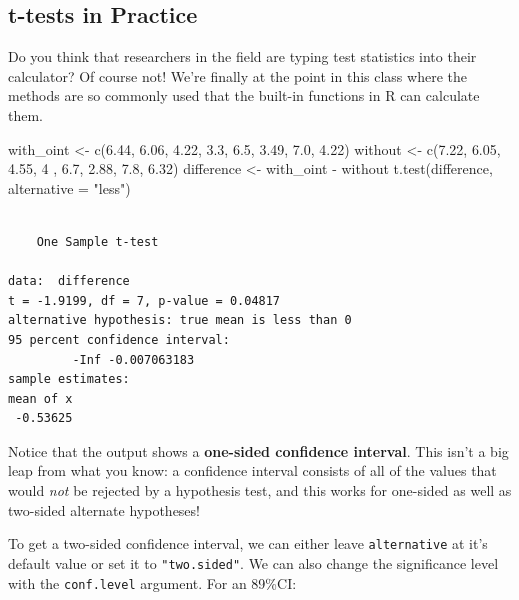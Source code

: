 \documentclass[
  letterpaper,
  DIV=11,
  numbers=noendperiod,
  oneside]{scrreprt}
\newenvironment{Shaded}{\begin{snugshade}}{\end{snugshade}}
\newcommand{\AttributeTok}[1]{\textcolor[rgb]{0.40,0.45,0.13}{#1}}
\newcommand{\DecValTok}[1]{\textcolor[rgb]{0.68,0.00,0.00}{#1}}
\newcommand{\FloatTok}[1]{\textcolor[rgb]{0.68,0.00,0.00}{#1}}
\newcommand{\FunctionTok}[1]{\textcolor[rgb]{0.28,0.35,0.67}{#1}}
\newcommand{\NormalTok}[1]{\textcolor[rgb]{0.00,0.23,0.31}{#1}}
\newcommand{\OtherTok}[1]{\textcolor[rgb]{0.00,0.23,0.31}{#1}}
\newcommand{\SpecialCharTok}[1]{\textcolor[rgb]{0.37,0.37,0.37}{#1}}
\newcommand{\StringTok}[1]{\textcolor[rgb]{0.13,0.47,0.30}{#1}}
\begin{document}
\hypertarget{t-tests-in-practice}{%
\subsection{t-tests in Practice}\label{t-tests-in-practice}}

Do you think that researchers in the field are typing test statistics
into their calculator? Of course not! We're finally at the point in this
class where the methods are so commonly used that the built-in functions
in R can calculate them.

\begin{Shaded}
\begin{Highlighting}[]
\NormalTok{with\_oint }\OtherTok{\textless{}{-}} \FunctionTok{c}\NormalTok{(}\FloatTok{6.44}\NormalTok{, }\FloatTok{6.06}\NormalTok{, }\FloatTok{4.22}\NormalTok{, }\FloatTok{3.3}\NormalTok{, }\FloatTok{6.5}\NormalTok{, }\FloatTok{3.49}\NormalTok{, }\FloatTok{7.0}\NormalTok{, }\FloatTok{4.22}\NormalTok{)}
\NormalTok{without }\OtherTok{\textless{}{-}} \FunctionTok{c}\NormalTok{(}\FloatTok{7.22}\NormalTok{, }\FloatTok{6.05}\NormalTok{, }\FloatTok{4.55}\NormalTok{, }\DecValTok{4}\NormalTok{  , }\FloatTok{6.7}\NormalTok{, }\FloatTok{2.88}\NormalTok{, }\FloatTok{7.8}\NormalTok{, }\FloatTok{6.32}\NormalTok{)}
\NormalTok{difference }\OtherTok{\textless{}{-}}\NormalTok{ with\_oint }\SpecialCharTok{{-}}\NormalTok{ without}
\FunctionTok{t.test}\NormalTok{(difference, }\AttributeTok{alternative =} \StringTok{"less"}\NormalTok{)}
\end{Highlighting}
\end{Shaded}

\begin{verbatim}

    One Sample t-test

data:  difference
t = -1.9199, df = 7, p-value = 0.04817
alternative hypothesis: true mean is less than 0
95 percent confidence interval:
         -Inf -0.007063183
sample estimates:
mean of x 
 -0.53625 
\end{verbatim}

Notice that the output shows a \textbf{one-sided confidence interval}.
This isn't a big leap from what you know: a confidence interval consists
of all of the values that would \emph{not} be rejected by a hypothesis
test, and this works for one-sided as well as two-sided alternate
hypotheses!

To get a two-sided confidence interval, we can either leave
\texttt{alternative} at it's default value or set it to
\texttt{"two.sided"}. We can also change the significance level with the
\texttt{conf.level} argument. For an 89\%CI:
\end{document}
